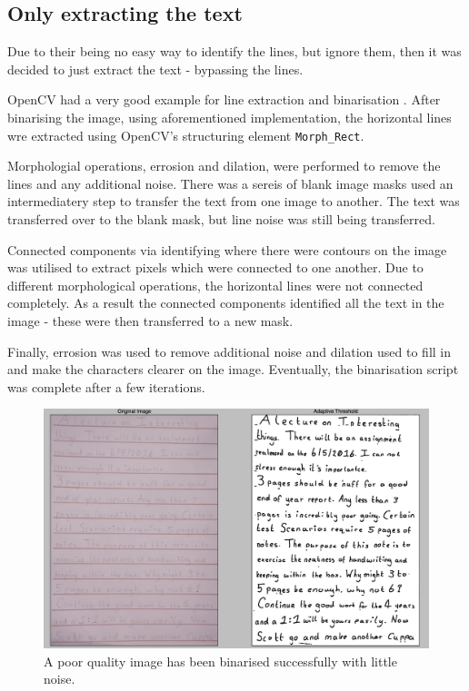 \subsection{Only extracting the text}
Due to their being no easy way to identify the lines, but ignore them, then it was decided to just extract the text - bypassing the lines.

OpenCV had a very good example for line extraction and binarisation \cite{citeulike:14006256}. After binarising the image, using aforementioned implementation, the horizontal lines wre extracted using OpenCV's structuring element \texttt{Morph\_Rect}.

Morphologial operations, errosion and dilation, were performed to remove the lines and any additional noise. There was a sereis of blank image masks used an intermediatery step to transfer the text from one image to another. The text was transferred over to the blank mask, but line noise was still being transferred.

Connected components via identifying where there were contours on the image was utilised to extract pixels which were connected to one another. Due to different morphological operations, the horizontal lines were not connected completely. As a result the connected components identified all the text in the image - these were then transferred to a new mask.

Finally, errosion was used to remove additional noise and dilation used to fill in and make the characters clearer on the image. Eventually, the binarisation script was complete after a few iterations.

\begin{figure}[H]
  \centering
  \includegraphics[scale=0.3]{images/hard_image}
  \caption{A poor quality image has been binarised successfully with little noise.}
  \label{fig:poor_quality}
\end{figure}

